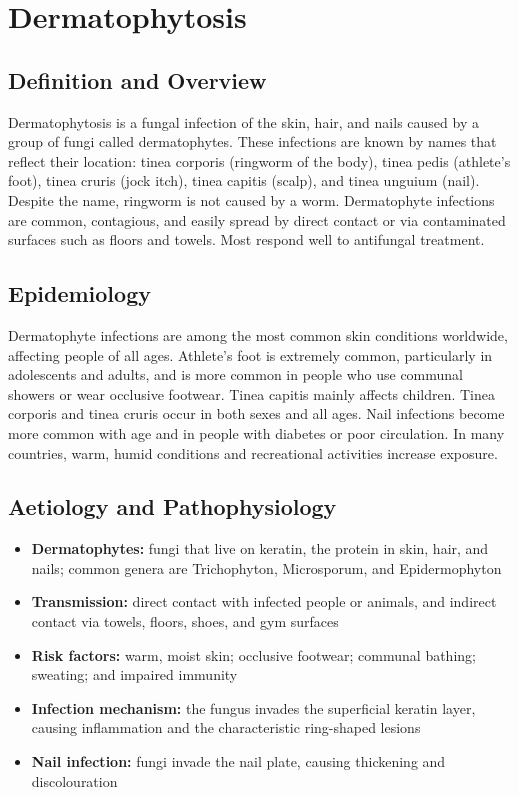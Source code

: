 \chapter{Dermatophytosis}

\section*{Definition and Overview}
Dermatophytosis is a fungal infection of the skin, hair, and nails caused by a group of fungi called dermatophytes. These infections are known by names that reflect their location: tinea corporis (ringworm of the body), tinea pedis (athlete's foot), tinea cruris (jock itch), tinea capitis (scalp), and tinea unguium (nail). Despite the name, ringworm is not caused by a worm. Dermatophyte infections are common, contagious, and easily spread by direct contact or via contaminated surfaces such as floors and towels. Most respond well to antifungal treatment.

\section*{Epidemiology}
Dermatophyte infections are among the most common skin conditions worldwide, affecting people of all ages. Athlete's foot is extremely common, particularly in adolescents and adults, and is more common in people who use communal showers or wear occlusive footwear. Tinea capitis mainly affects children. Tinea corporis and tinea cruris occur in both sexes and all ages. Nail infections become more common with age and in people with diabetes or poor circulation. In many countries, warm, humid conditions and recreational activities increase exposure.

\section*{Aetiology and Pathophysiology}
\begin{itemize}
    \item \textbf{Dermatophytes:} fungi that live on keratin, the protein in skin, hair, and nails; common genera are Trichophyton, Microsporum, and Epidermophyton
    \item \textbf{Transmission:} direct contact with infected people or animals, and indirect contact via towels, floors, shoes, and gym surfaces
    \item \textbf{Risk factors:} warm, moist skin; occlusive footwear; communal bathing; sweating; and impaired immunity
    \item \textbf{Infection mechanism:} the fungus invades the superficial keratin layer, causing inflammation and the characteristic ring-shaped lesions
    \item \textbf{Nail infection:} fungi invade the nail plate, causing thickening and discolouration
\end{itemize}

